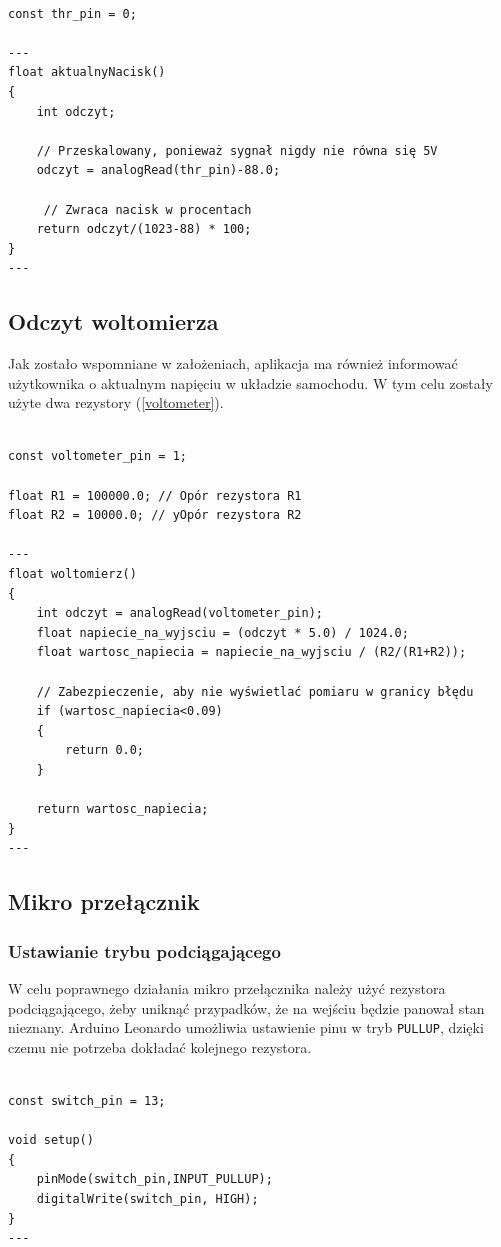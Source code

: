 \begin{lstlisting}[label=list:code_thr,caption=Obliczanie procentowego nacisku na pedał gazu,
basicstyle=\footnotesize\ttfamily]

const thr_pin = 0;

---
float aktualnyNacisk()
{
    int odczyt;
    
    // Przeskalowany, ponieważ sygnał nigdy nie równa się 5V
    odczyt = analogRead(thr_pin)-88.0; 
    
     // Zwraca nacisk w procentach
    return odczyt/(1023-88) * 100;
}
---
\end{lstlisting}


\subsection{Odczyt woltomierza}

Jak zostało wspomniane w założeniach, aplikacja ma również informować użytkownika o aktualnym napięciu w układzie samochodu. W tym celu zostały użyte dwa rezystory (\ref{voltometer}).

\begin{lstlisting}[label=list:code_thr,caption=Obliczanie aktualnego napięcia,
basicstyle=\footnotesize\ttfamily]

const voltometer_pin = 1;

float R1 = 100000.0; // Opór rezystora R1
float R2 = 10000.0; // yOpór rezystora R2

---
float woltomierz()
{
    int odczyt = analogRead(voltometer_pin);
    float napiecie_na_wyjsciu = (odczyt * 5.0) / 1024.0;
    float wartosc_napiecia = napiecie_na_wyjsciu / (R2/(R1+R2));
    
    // Zabezpieczenie, aby nie wyświetlać pomiaru w granicy błędu
    if (wartosc_napiecia<0.09)
    {
    	return 0.0;
    }
    
    return wartosc_napiecia;
}
---
\end{lstlisting}


\subsection{Mikro przełącznik}

\subsubsection{Ustawianie trybu podciągającego}

W celu poprawnego działania mikro przełącznika należy użyć rezystora podciągającego, żeby uniknąć przypadków, że na wejściu będzie panował stan nieznany. Arduino Leonardo umożliwia ustawienie pinu w tryb \texttt{PULLUP}, dzięki czemu nie potrzeba dokładać kolejnego rezystora. 
\begin{lstlisting}[label=list:code_pullup,caption=Ustawianie pinu switcha w tryb PULLUP,
basicstyle=\footnotesize\ttfamily]

const switch_pin = 13;

void setup()
{
    pinMode(switch_pin,INPUT_PULLUP);
    digitalWrite(switch_pin, HIGH);
}
---
\end{lstlisting}

